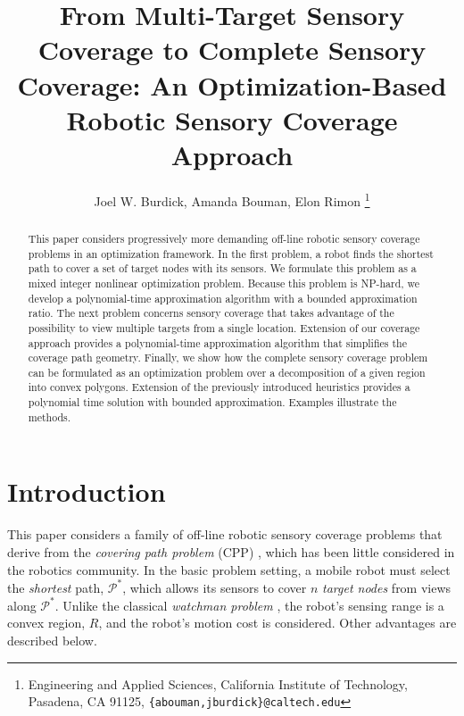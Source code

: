\documentclass[letterpaper, 10 pt, conference]{ieeeconf}
\title{\LARGE \bf From Multi-Target Sensory Coverage to Complete Sensory Coverage: An Optimization-Based Robotic Sensory Coverage Approach}
\author{Joel W. Burdick, Amanda Bouman, Elon Rimon \thanks{Engineering and Applied Sciences, California Institute of Technology, Pasadena, CA 91125, \texttt{\{abouman,jburdick\}@caltech.edu}}}
\theoremstyle{definition}
\begin{document}
\maketitle
\thispagestyle{empty}
\pagestyle{empty}

\begin{abstract}

This paper considers progressively more demanding off-line robotic sensory coverage problems in an optimization framework.  In the first problem, a robot finds the shortest path to cover a set of target nodes with its sensors. We formulate this problem as a mixed integer nonlinear optimization problem. Because this problem is NP-hard, we develop a polynomial-time approximation algorithm with a bounded approximation ratio.
The next problem concerns sensory coverage
that takes advantage of the possibility to view multiple targets from a single location. 
Extension of our coverage  
approach 
provides a polynomial-time approximation algorithm that simplifies the coverage path geometry.  Finally, we show how the complete sensory coverage problem can be formulated as an optimization problem over a decomposition of a given region into convex polygons.  Extension of the previously introduced heuristics provides a polynomial time solution with bounded approximation.  Examples illustrate the methods.
\end{abstract}


\section{Introduction} \label{sec:intro}

\noindent This paper considers a family of off-line robotic sensory coverage problems that derive from the {\em covering path problem} (CPP)
\cite{current_covering_1989,current_efficient_1994,arkin_approximation_1994}, which has been little considered in the robotics community.  In the basic problem setting, a mobile robot must select the {\em shortest} path, $\mathcal{P}^{*}$, which allows its sensors to cover $n$ {\em target nodes} from views along $\mathcal{P}^*$.  Unlike the classical {\em watchman problem} \cite{urrutia_art_2000,danner_randomized_2000}, the robot's sensing range is a convex region, $R$, and  the robot's motion cost is considered.  Other advantages are described below.
\end{document}
